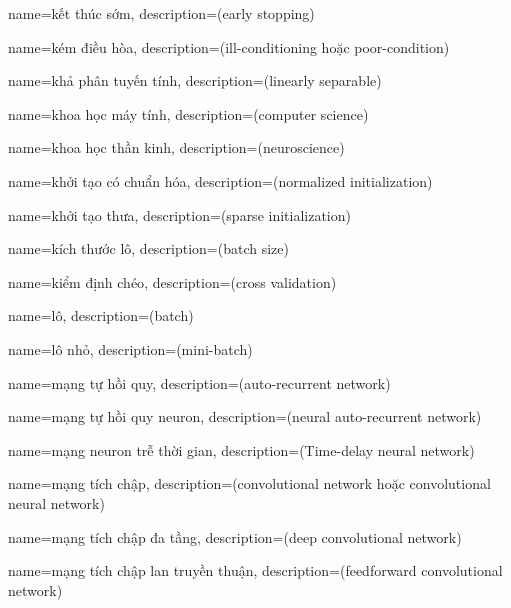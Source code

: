 {
    name={kết thúc sớm},
    description={(early stopping)}
}

{
    name={kém điều hòa},
    description={(ill-conditioning hoặc poor-condition)}
}

{
    name={khả phân tuyến tính},
    description={(linearly separable)}
}

{
    name={khoa học máy tính},
    description={(computer science)}
}

{
    name={khoa học thần kinh},
    description={(neuroscience)}
}

{
    name={khởi tạo có chuẩn hóa},
    description={(normalized initialization)}
}

{
    name={khởi tạo thưa},
    description={(sparse initialization)}
}

{
    name={kích thước lô},
    description={(batch size)}
}

{
    name={kiểm định chéo},
    description={(cross validation)}
}

{
    name={lô},
    description={(batch)}
}

{
    name={lô nhỏ},
    description={(mini-batch)}
}

{
    name={mạng tự hồi quy},
    description={(auto-recurrent network)}
}

{
    name={mạng tự hồi quy neuron},
    description={(neural auto-recurrent network)}
}

{
    name={mạng neuron trễ thời gian},
    description={(Time-delay neural network)}
}


{
    name={mạng tích chập},
    description={(convolutional network hoặc convolutional neural network)}
}


{
    name={mạng tích chập đa tầng},
    description={(deep convolutional network)}
}

{
    name={mạng tích chập lan truyền thuận},
    description={(feedforward convolutional network)}
}

